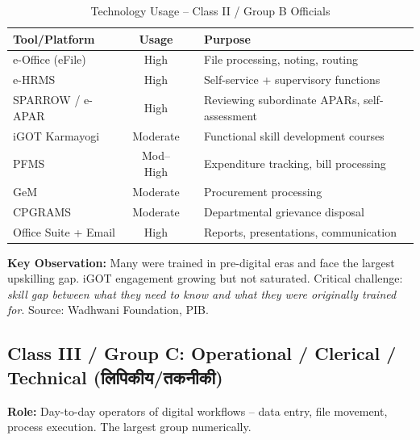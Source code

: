 \documentclass[12pt,a4paper]{article}
\newcommand{\hindi}[1]{{\hindifont #1}}
\begin{document}
\begin{table}[H]
\centering
\caption{Technology Usage  --  Class II / Group B Officials}
\label{tab:class2}
\begin{tabularx}{\textwidth}{@{}lcp{1cm}X@{}}
\toprule
\textbf{Tool/Platform} & \textbf{Usage} & & \textbf{Purpose} \\
\midrule
e-Office (eFile) & High & & File processing, noting, routing \\
e-HRMS & High & & Self-service + supervisory functions \\
SPARROW / e-APAR & High & & Reviewing subordinate APARs, self-assessment \\
iGOT Karmayogi & Moderate & & Functional skill development courses \\
PFMS & Mod--High & & Expenditure tracking, bill processing \\
GeM & Moderate & & Procurement processing \\
CPGRAMS & Moderate & & Departmental grievance disposal \\
Office Suite + Email & High & & Reports, presentations, communication \\
\bottomrule
\end{tabularx}
\end{table}

\textbf{Key Observation:} Many were trained in pre-digital eras and face the largest upskilling gap. iGOT engagement growing but not saturated. Critical challenge: \textit{skill gap between what they need to know and what they were originally trained for}. Source: Wadhwani Foundation, PIB.

\subsection{Class III / Group C: Operational / Clerical / Technical (\hindi{लिपिकीय/तकनीकी})}

\textbf{Role:} Day-to-day operators of digital workflows -- data entry, file movement, process execution. The largest group numerically.
\end{document}
